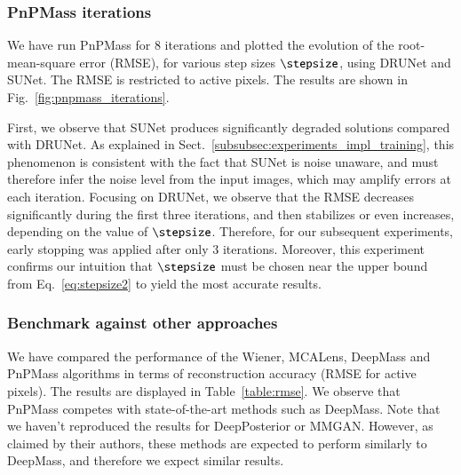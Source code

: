 \documentclass{aa}
\begin{document}
\subsubsection{PnPMass iterations}

We have run PnPMass for $8$ iterations and plotted the evolution of the root-mean-square error (RMSE), for various step sizes $\stepsize$, using DRUNet and SUNet. The RMSE is restricted to active pixels. The results are shown in Fig.~\ref{fig:pnpmass_iterations}.

First, we observe that SUNet produces significantly degraded solutions compared with DRUNet. As explained in Sect.~\ref{subsubsec:experiments_impl_training}, this phenomenon is consistent with the fact that SUNet is noise unaware, and must therefore infer the noise level from the input images, which may amplify errors at each iteration.
Focusing on DRUNet, we observe that the RMSE decreases significantly during the first three iterations, and then stabilizes or even increases, depending on the value of $\stepsize$.
Therefore, for our subsequent experiments, early stopping was applied after only $3$ iterations.
Moreover, this experiment confirms our intuition that $\stepsize$ must be chosen near the upper bound from Eq.~\eqref{eq:stepsize2} to yield the most accurate results.

\subsubsection{Benchmark against other approaches}

We have compared the performance of the Wiener, MCALens, DeepMass and PnPMass algorithms in terms of reconstruction accuracy (RMSE for active pixels). The results are displayed in Table~\ref{table:rmse}. We observe that PnPMass competes with state-of-the-art methods such as DeepMass. Note that we haven't reproduced the results for DeepPosterior or MMGAN. However, as claimed by their authors, these methods are expected to perform similarly to DeepMass, and therefore we expect similar results.
\end{document}
